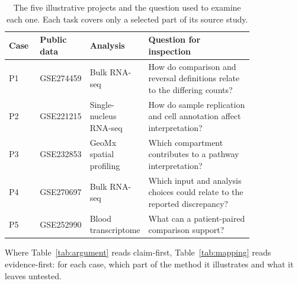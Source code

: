 \documentclass[11pt]{article}
\begin{document}
\begin{table}[!htbp]
\centering
\small
\caption{The five illustrative projects and the question used to examine each one. Each task covers only a selected part of its source study.}
\label{tab:cases}
\begin{tabular}{@{}l >{\raggedright\arraybackslash}p{0.18\linewidth} >{\raggedright\arraybackslash}p{0.21\linewidth} >{\raggedright\arraybackslash}p{0.43\linewidth}@{}}
\hline
Case & Public data & Analysis & Question for inspection \\
\hline
P1 & GSE274459 & Bulk RNA-seq & How do comparison and reversal definitions relate to the differing counts? \\
P2 & GSE221215 & Single-nucleus RNA-seq & How do sample replication and cell annotation affect interpretation? \\
P3 & GSE232853 & GeoMx spatial profiling & Which compartment contributes to a pathway interpretation? \\
P4 & GSE270697 & Bulk RNA-seq & Which input and analysis choices could relate to the reported discrepancy? \\
P5 & GSE252990 & Blood transcriptome & What can a patient-paired comparison support? \\
\hline
\end{tabular}
\end{table}

Where Table~\ref{tab:argument} reads claim-first, Table~\ref{tab:mapping} reads evidence-first: for each case, which part of the method it illustrates and what it leaves untested.
\end{document}
